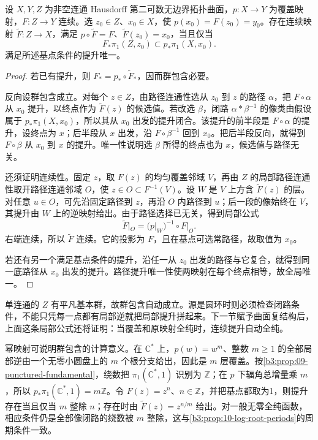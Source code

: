 \begin{theorem}[映射提升的判别]\label{b3:thm:11-map-lifting}
设 \(X,Y,Z\) 为非空连通 Hausdorff 第二可数无边界拓扑曲面，\(p:X\to Y\) 为覆盖映射，\(F:Z\to Y\) 连续。选 \(z_0\in Z\)、\(x_0\in X\)，使 \(p(x_0)=F(z_0)=y_0\)。存在连续映射 \(\widetilde F:Z\to X\)，满足 \(p\circ\widetilde F=F\)、\(\widetilde F(z_0)=x_0\)，当且仅当
\[
 F_*\pi_1(Z,z_0)\subset p_*\pi_1(X,x_0).
\]
满足所述基点条件的提升唯一。
\end{theorem}
\begin{proof}
若已有提升，则 \(F_*=p_*\circ\widetilde F_*\)，因而群包含必要。

反向设群包含成立。对每个 \(z\in Z\)，由路径连通性选从 \(z_0\) 到 \(z\) 的路径 \(\alpha\)，把 \(F\circ\alpha\) 从 \(x_0\) 提升，以终点作为 \(\widetilde F(z)\) 的候选值。若改选 \(\beta\)，闭路 \(\alpha*\beta^{-1}\) 的像类由假设属于 \(p_*\pi_1(X,x_0)\)，所以其从 \(x_0\) 出发的提升闭合。该提升的前半段是 \(F\circ\alpha\) 的提升，设终点为 \(x\)；后半段从 \(x\) 出发，沿 \(F\circ\beta^{-1}\) 回到 \(x_0\)。把后半段反向，就得到 \(F\circ\beta\) 从 \(x_0\) 到 \(x\) 的提升。唯一性说明选 \(\beta\) 所得的终点也为 \(x\)，候选值与路径无关。

还须证明连续性。固定 \(z\)，取 \(F(z)\) 的均匀覆盖邻域 \(V\)，再由 \(Z\) 的局部路径连通性取开路径连通邻域 \(O\)，使 \(z\in O\subset F^{-1}(V)\)。设 \(W\) 是 \(V\) 上方含 \(\widetilde F(z)\) 的层。对任意 \(u\in O\)，可先沿固定路径到 \(z\)，再沿 \(O\) 内路径到 \(u\)；后一段的像始终在 \(V\)，其提升由 \(W\) 上的逆映射给出。由于路径选择已无关，得到局部公式
\[
 \widetilde F|_O=(p|_W)^{-1}\circ F|_O.
\]
右端连续，所以 \(\widetilde F\) 连续。它的投影为 \(F\)，且在基点可选常路径，故取值为 \(x_0\)。

若还有另一个满足基点条件的提升，沿任一从 \(z_0\) 出发的路径与它复合，就得到同一底路径从 \(x_0\) 出发的提升。路径提升唯一性使两映射在每个终点相等，故全局唯一。
\end{proof}
单连通的 \(Z\) 有平凡基本群，故群包含自动成立。源是圆环时则必须检查闭路条件，不能只凭每一点都有局部逆就把局部提升拼起来。下一节赋予曲面复结构后，上面这条局部公式还将证明：当覆盖和原映射全纯时，连续提升自动全纯。

\ProseParagraphBreak
幂映射可说明群包含的计算意义。在 \(\mathbb C^*\) 上，\(p(w)=w^m\)、整数 \(m\ge1\) 的全部局部逆由一个无零小圆盘上的 \(m\) 个根分支给出，因此是 \(m\) 层覆盖。按\cref{b3:prop:09-punctured-fundamental}，绕数把 \(\pi_1(\mathbb C^*,1)\) 识别为 \(\mathbb Z\)；在 \(p\) 下辐角总增量乘 \(m\)，所以 \(p_*\pi_1(\mathbb C^*,1)=m\mathbb Z\)。令 \(F(z)=z^n\)、\(n\in\mathbb Z\)，并把基点都取为1，则提升存在当且仅当 \(m\) 整除 \(n\)；存在时由 \(\widetilde F(z)=z^{n/m}\) 给出。对一般无零全纯函数，相应条件仍是全部像闭路的绕数被 \(m\) 整除，这与\cref{b3:prop:10-log-root-periods}的周期条件一致。

